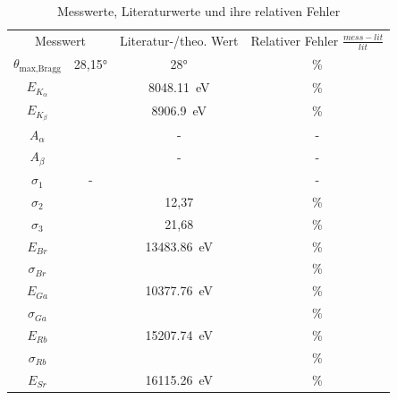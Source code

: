 \begin{table}[H]
\centering
\caption{Messwerte, Literaturwerte und ihre relativen Fehler}
\begin{tabular}{c c c c}
    \toprule
    \multicolumn{2}{c}{Messwert} &\multicolumn{1}{c}{Literatur-/theo. Wert}  &\multicolumn{1}{c}{Relativer Fehler $\frac{mess-lit}{lit} $}  \\
    \cmidrule(lr){1-4} 
       $\theta _{\text{max,Bragg}}$ & 28,15°  & 28° & \text{}\% \\
       $E_{K_{\alpha}} $ & \text{} & \SI{8048.11}{\electronvolt} \cite{NIST} & \text{}\% \\
       $E_{K_{\beta}}$ & \text{} & \SI{8906.9}{\electronvolt}\cite{NIST} & \text{}\%  \\
       $A_{\alpha} $ & \text{} & - & - \\
       $A_{\beta} $ & \text{} & - & - \\
       $\sigma _1 $ & - & \text{} & - \\
       $\sigma _2 $ & \text{} & 12,37 & \text{} \% \\
       $\sigma _3 $ & \text{} & 21,68 & \text{}\% \\
       $E_{Br} $ & \text{} & \SI{13483.86}{\electronvolt}\cite{NIST} & \text{}\%  \\
       $\sigma _{Br} $ & \text{} & \text{} & \text{}\% \\
       $E_{Ga}$ & \text{} & \SI{10377.76}{\electronvolt}\cite{NIST} & \text{}\% \\
       $\sigma _{Ga} $ & \text{} & \text{} & \text{}\% \\
       $E_{Rb}$ & \text{} & \SI{15207.74}{\electronvolt}\cite{NIST} & \text{} \%\\
       $\sigma _{Rb} $ & \text{} & \text{} & \text{} \%\\
       $E_{Sr}$ & \text{} & \SI{16115.26}{\electronvolt}\cite{NIST} & \text{}\% \\

\end{tabular}
\end{table}
